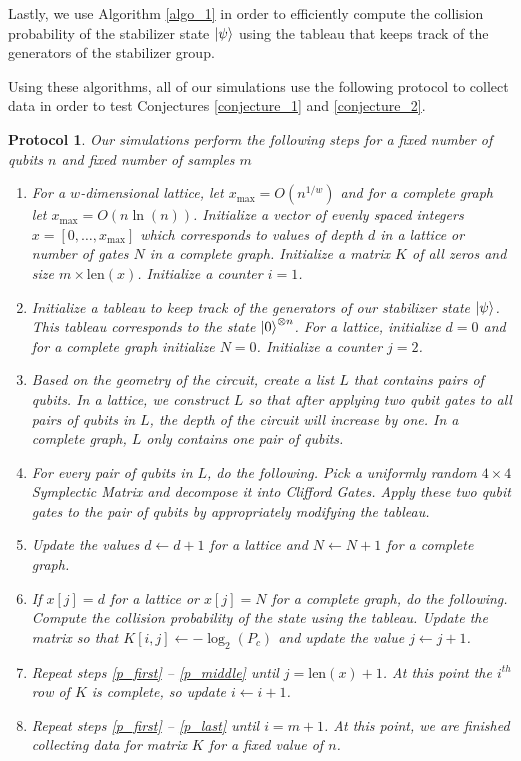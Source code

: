 \documentclass[11pt]{article}
\newtheorem{proto}{Protocol}
\theoremstyle{definition}
\theoremstyle{plain}
\begin{document}
Lastly, we use Algorithm {\ref{algo_1}} in order to efficiently compute the collision probability of the stabilizer state $\ket{\psi}$ using the tableau that keeps track of the generators of the stabilizer group.

Using these algorithms, all of our simulations use the following protocol to collect data in order to test Conjectures {\ref{conjecture_1}} and {\ref{conjecture_2}}. \\
\begin{proto}\label{proto_1} Our simulations perform the following steps for a fixed number of qubits $n$ and fixed number of samples $m$

  \begin{enumerate}[label = (\arabic*)]
  \item For a $w$-dimensional lattice, let $x_{\max} = O(n^{1/w})$ and for a complete graph let $x_{\max} = O(n \ln(n))$. Initialize a vector of evenly spaced integers $x = [0, \ldots, x_{\max}]$ which corresponds to values of depth $d$ in a lattice or number of gates $N$ in a complete graph. Initialize a matrix $K$ of all zeros and size $m \times \text{len}(x)$. Initialize a counter $i = 1$. 
  \item\label{p_first} Initialize a tableau to keep track of the generators of our stabilizer state $\ket{\psi}$. This tableau corresponds to the state $\ket{0}^{\otimes n }$. For a lattice, initialize $d = 0$ and for a complete graph initialize $N = 0$. Initialize a counter $j = 2$. 
  \item Based on the geometry of the circuit, create a list $L$ that contains pairs of qubits. In a lattice, we construct $L$ so that after applying two qubit gates to all pairs of qubits in $L$, the depth of the circuit will increase by one. In a complete graph, $L$ only contains one pair of qubits.
  \item For every pair of qubits in $L$, do the following. Pick a uniformly random $4 \times 4$ Symplectic Matrix and decompose it into Clifford Gates. Apply these two qubit gates to the pair of qubits by appropriately modifying the tableau.
  \item Update the values $d \leftarrow d + 1$ for a lattice and $N \leftarrow N + 1$ for a complete graph.
  \item\label{p_middle} If $x[j] = d$ for a lattice or $x[j] = N$ for a complete graph, do the following. Compute the collision probability of the state using the tableau. Update the matrix so that $K[i, j] \leftarrow - \log_2(P_c)$ and update the value $j \leftarrow j + 1$.
  \item\label{p_last} Repeat steps {\ref{p_first}} {--} {\ref{p_middle}} until $j = \text{len}(x) + 1$. At this point the $i^{th}$ row of $K$ is complete, so update $i \leftarrow i + 1$. 
  \item Repeat steps {\ref{p_first}} {--} {\ref{p_last}} until $i = m+1$. At this point, we are finished collecting data for matrix $K$ for a fixed value of $n$. 
  \end{enumerate}
\end{proto}
\end{document}
